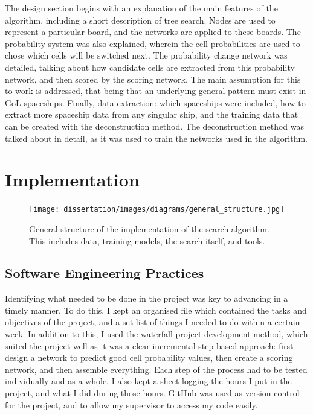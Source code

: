 \documentclass{l4proj}
\begin{document}
The design section begins with an explanation of the main features of the algorithm, including a short description of tree search. Nodes are used to represent a particular board, and the networks are applied to these boards. The probability system was also explained, wherein the cell probabilities are used to chose which cells will be switched next. The probability change network was detailed, talking about how candidate cells are extracted from this probability network, and then scored by the scoring network. The main assumption for this to work is addressed, that being that an underlying general pattern must exist in GoL spaceships. Finally, data extraction: which spaceships were included, how to extract more spaceship data from any singular ship, and the training data that can be created with the deconstruction method. The deconstruction method was talked about in detail, as it was used to train the networks used in the algorithm.


\chapter{Implementation}

\begin{figure}[h!]
\centering
\texttt{[image: dissertation/images/diagrams/general\_structure.jpg]} 
\caption{General structure of the implementation of the search algorithm. This includes data, training models, the search itself, and tools.}
\label{fig:subim1}
\end{figure}

\section{Software Engineering Practices}

Identifying what needed to be done in the project was key to advancing in a timely manner. To do this, I kept an organised file which contained the tasks and objectives of the project, and a set list of things I needed to do within a certain week. In addition to this, I used the waterfall project development method, which suited the project well as it was a clear incremental step-based approach: first design a network to predict good cell probability values, then create a scoring network, and then assemble everything. Each step of the process had to be tested individually and as a whole. I also kept a sheet logging the hours I put in the project, and what I did during those hours. GitHub was used as version control for the project, and to allow my supervisor to access my code easily.
\end{document}
